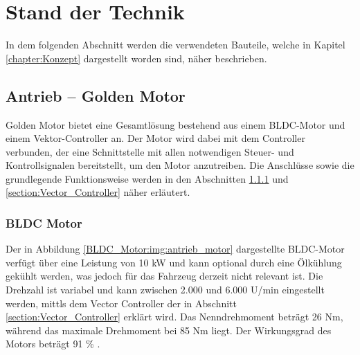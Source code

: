 \chapter{Stand der Technik}
\label{chapter:Stand_der_Technik}



In dem folgenden Abschnitt werden die verwendeten Bauteile, welche in Kapitel \ref{chapter:Konzept} dargestellt worden sind, näher beschrieben.


\section{Antrieb – Golden Motor}
\label{section:Antrieb}

Golden Motor bietet eine Gesamtlösung bestehend aus einem BLDC-Motor und einem Vektor-Controller an. Der Motor wird dabei mit dem Controller verbunden, der eine Schnittstelle mit allen notwendigen Steuer- und Kontrollsignalen bereitstellt, um den Motor anzutreiben. Die Anschlüsse sowie die grundlegende Funktionsweise werden in den Abschnitten \ref{section:BLDC_Motor} und \ref{section:Vector_Controller} näher erläutert.



\subsection{BLDC Motor}
\label{section:BLDC_Motor}


Der in Abbildung \ref{BLDC_Motor:img:antrieb_motor} dargestellte BLDC-Motor verfügt über eine Leistung von 10 kW und kann optional durch eine Ölkühlung gekühlt werden, was jedoch für das Fahrzeug derzeit nicht relevant ist. Die Drehzahl ist variabel und kann zwischen 2.000 und 6.000 U/min eingestellt werden, mittls dem Vector Controller der in Abschnitt \ref{section:Vector_Controller} erklärt wird. Das Nenndrehmoment beträgt 26 Nm, während das maximale Drehmoment bei 85 Nm liegt. Der Wirkungsgrad des Motors beträgt 91 \% \cite{Golden_Motor:bldc_motor}.

